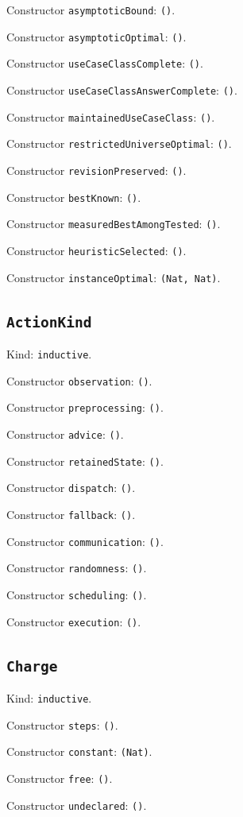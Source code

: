\documentclass[11pt]{article}
\begin{document}
\noindent Constructor \texttt{asymptoticBound}: \texttt{()}.\par
\noindent Constructor \texttt{asymptoticOptimal}: \texttt{()}.\par
\noindent Constructor \texttt{useCaseClassComplete}: \texttt{()}.\par
\noindent Constructor \texttt{useCaseClassAnswerComplete}: \texttt{()}.\par
\noindent Constructor \texttt{maintainedUseCaseClass}: \texttt{()}.\par
\noindent Constructor \texttt{restrictedUniverseOptimal}: \texttt{()}.\par
\noindent Constructor \texttt{revisionPreserved}: \texttt{()}.\par
\noindent Constructor \texttt{bestKnown}: \texttt{()}.\par
\noindent Constructor \texttt{measuredBestAmongTested}: \texttt{()}.\par
\noindent Constructor \texttt{heuristicSelected}: \texttt{()}.\par
\noindent Constructor \texttt{instanceOptimal}: \texttt{(Nat, Nat)}.\par
\subsection*{\texttt{ActionKind}}
\noindent Kind: \texttt{inductive}.\par
\noindent Constructor \texttt{observation}: \texttt{()}.\par
\noindent Constructor \texttt{preprocessing}: \texttt{()}.\par
\noindent Constructor \texttt{advice}: \texttt{()}.\par
\noindent Constructor \texttt{retainedState}: \texttt{()}.\par
\noindent Constructor \texttt{dispatch}: \texttt{()}.\par
\noindent Constructor \texttt{fallback}: \texttt{()}.\par
\noindent Constructor \texttt{communication}: \texttt{()}.\par
\noindent Constructor \texttt{randomness}: \texttt{()}.\par
\noindent Constructor \texttt{scheduling}: \texttt{()}.\par
\noindent Constructor \texttt{execution}: \texttt{()}.\par
\subsection*{\texttt{Charge}}
\noindent Kind: \texttt{inductive}.\par
\noindent Constructor \texttt{steps}: \texttt{()}.\par
\noindent Constructor \texttt{constant}: \texttt{(Nat)}.\par
\noindent Constructor \texttt{free}: \texttt{()}.\par
\noindent Constructor \texttt{undeclared}: \texttt{()}.\par
\end{document}
